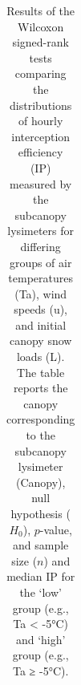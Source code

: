 \documentclass[
  letterpaper,
]{tex/uofsthesis-cs}
\begin{document}
\begin{longtable}[]{@{}
  >{\raggedright\arraybackslash}p{}
  >{\raggedright\arraybackslash}p{}
  >{\raggedright\arraybackslash}p{}
  >{\raggedright\arraybackslash}p{}
  >{\raggedright\arraybackslash}p{}
  >{\raggedright\arraybackslash}p{}@{}}

\caption{\label{tbl-scl-hrly-stats}Results of the Wilcoxon signed-rank
tests comparing the distributions of hourly interception efficiency (IP)
measured by the subcanopy lysimeters for differing groups of air
temperatures (Ta), wind speeds (u), and initial canopy snow loads (L).
The table reports the canopy corresponding to the subcanopy lysimeter
(Canopy), null hypothesis (\(H_0\)), \(p\)-value, and sample size
(\(n\)) and median IP for the `low' group (e.g., Ta \textless{} -5°C)
and `high' group (e.g., Ta ≥ -5°C).}

\tabularnewline


\end{longtable}
\end{document}
